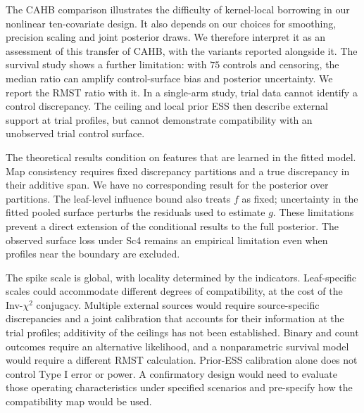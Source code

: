 The CAHB comparison illustrates the difficulty of kernel-local borrowing in our nonlinear ten-covariate design. It also depends on our choices for smoothing, precision scaling and joint posterior draws. We therefore interpret it as an assessment of this transfer of CAHB, with the variants reported alongside it. The survival study shows a further limitation: with $75$ controls and censoring, the median ratio can amplify control-surface bias and posterior uncertainty. We report the RMST ratio with it. In a single-arm study, trial data cannot identify a control discrepancy. The ceiling and local prior ESS then describe external support at trial profiles, but cannot demonstrate compatibility with an unobserved trial control surface.

The theoretical results condition on features that are learned in the fitted model. Map consistency requires fixed discrepancy partitions and a true discrepancy in their additive span. We have no corresponding result for the posterior over partitions. The leaf-level influence bound also treats $f$ as fixed; uncertainty in the fitted pooled surface perturbs the residuals used to estimate $g$. These limitations prevent a direct extension of the conditional results to the full posterior. The observed surface loss under Sc4 remains an empirical limitation even when profiles near the boundary are excluded.

The spike scale is global, with locality determined by the indicators. Leaf-specific scales could accommodate different degrees of compatibility, at the cost of the Inv-$\chi^2$ conjugacy. Multiple external sources would require source-specific discrepancies and a joint calibration that accounts for their information at the trial profiles; additivity of the ceilings has not been established. Binary and count outcomes require an alternative likelihood, and a nonparametric survival model would require a different RMST calculation. Prior-ESS calibration alone does not control Type I error or power. A confirmatory design would need to evaluate those operating characteristics under specified scenarios and pre-specify how the compatibility map would be used.
